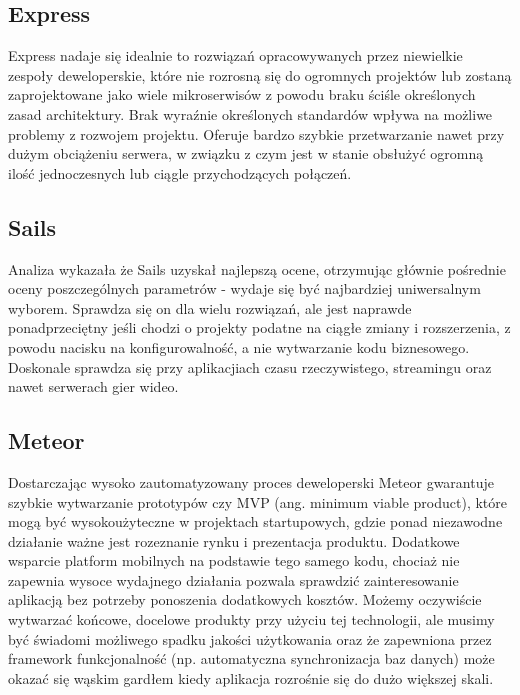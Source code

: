 \documentclass[12pt]{report}
\begin{document}
    \subsection{Express}
      Express nadaje się idealnie to rozwiązań opracowywanych przez niewielkie zespoły deweloperskie, które nie rozrosną się do ogromnych projektów lub zostaną zaprojektowane jako wiele mikroserwisów z powodu braku ściśle określonych zasad architektury. 
      Brak wyraźnie określonych standardów wpływa na możliwe problemy z rozwojem projektu. 
      Oferuje bardzo szybkie przetwarzanie nawet przy dużym obciążeniu serwera, w związku z czym jest w stanie obsłużyć ogromną ilość jednoczesnych lub ciągle przychodzących połączeń.

    \subsection{Sails}
      Analiza wykazała że Sails uzyskał najlepszą ocene, otrzymując głównie pośrednie oceny poszczególnych parametrów - wydaje się być najbardziej uniwersalnym wyborem.
      Sprawdza się on dla wielu rozwiązań, ale jest naprawde ponadprzeciętny jeśli chodzi o projekty podatne na ciągłe zmiany i rozszerzenia, z powodu nacisku na konfigurowalność, a nie wytwarzanie kodu biznesowego.
      Doskonale sprawdza się przy aplikacjiach czasu rzeczywistego, streamingu oraz nawet serwerach gier wideo.

    \subsection{Meteor}
      Dostarczając wysoko zautomatyzowany proces deweloperski Meteor gwarantuje szybkie wytwarzanie prototypów czy MVP (ang. minimum viable product), które mogą być wysokoużyteczne w projektach startupowych, gdzie ponad niezawodne działanie ważne jest rozeznanie rynku i prezentacja produktu.
      Dodatkowe wsparcie platform mobilnych na podstawie tego samego kodu, chociaż nie zapewnia wysoce wydajnego działania pozwala sprawdzić zainteresowanie aplikacją bez potrzeby ponoszenia dodatkowych kosztów.
      Możemy oczywiście wytwarzać końcowe, docelowe produkty przy użyciu tej technologii, ale musimy być świadomi możliwego spadku jakości użytkowania oraz że zapewniona przez framework funkcjonalność (np. automatyczna synchronizacja baz danych) może okazać się wąskim gardłem kiedy aplikacja rozrośnie się do dużo większej skali.

\end{document}
